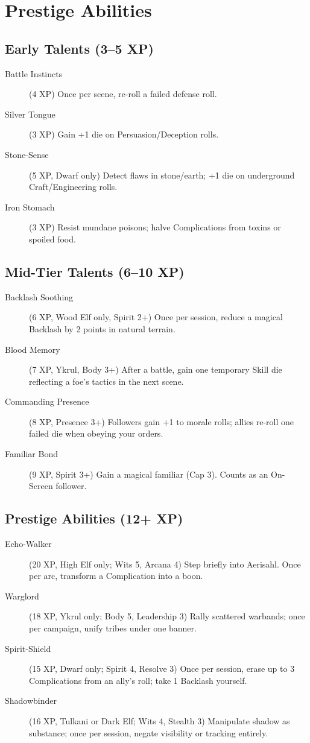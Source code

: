 \section{Prestige Abilities}

\subsection{Early Talents (3--5 XP)}

\begin{description}
\item[Battle Instincts] (4 XP) Once per scene, re-roll a failed defense roll.
\item[Silver Tongue] (3 XP) Gain +1 die on Persuasion/Deception rolls.
\item[Stone-Sense] (5 XP, Dwarf only) Detect flaws in stone/earth; +1 die on underground Craft/Engineering rolls.
\item[Iron Stomach] (3 XP) Resist mundane poisons; halve Complications from toxins or spoiled food.
\end{description}

\subsection{Mid-Tier Talents (6--10 XP)}

\begin{description}
\item[Backlash Soothing] (6 XP, Wood Elf only, Spirit 2+) Once per session, reduce a magical Backlash by 2 points in natural terrain.
\item[Blood Memory] (7 XP, Ykrul, Body 3+) After a battle, gain one temporary Skill die reflecting a foe's tactics in the next scene.
\item[Commanding Presence] (8 XP, Presence 3+) Followers gain +1 to morale rolls; allies re-roll one failed die when obeying your orders.
\item[Familiar Bond] (9 XP, Spirit 3+) Gain a magical familiar (Cap 3). Counts as an On-Screen follower.
\end{description}

\subsection{Prestige Abilities (12+ XP)}

\begin{description}
\item[Echo-Walker] (20 XP, High Elf only; Wits 5, Arcana 4) Step briefly into Aerisahl. Once per arc, transform a Complication into a boon.
\item[Warglord] (18 XP, Ykrul only; Body 5, Leadership 3) Rally scattered warbands; once per campaign, unify tribes under one banner.
\item[Spirit-Shield] (15 XP, Dwarf only; Spirit 4, Resolve 3) Once per session, erase up to 3 Complications from an ally's roll; take 1 Backlash yourself.
\item[Shadowbinder] (16 XP, Tulkani or Dark Elf; Wits 4, Stealth 3) Manipulate shadow as substance; once per session, negate visibility or tracking entirely.
\end{description}

